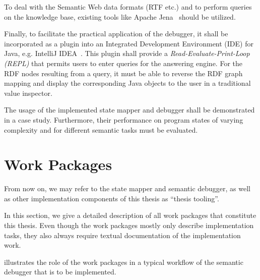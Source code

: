 \documentclass[
	english,
	accentcolor=9c,%
  marginpar=0cm %
	]{tudapub}
\begin{document}
To deal with the Semantic Web data formats (RTF etc.) and to perform queries on
the knowledge base, existing tools like Apache Jena~\cite{jena} should be utilized.

Finally, to facilitate the practical application of the debugger, it shall be
incorporated as a plugin into an Integrated Development Environment (IDE) for
Java, e.g. IntelliJ IDEA~\cite{idea}.
This plugin shall provide a \emph{Read-Evaluate-Print-Loop (REPL)} that permits
users to enter queries for the answering engine.
For the RDF nodes resulting from a query, it must be able to reverse the RDF
graph mapping and display the corresponding Java objects to the user in a
traditional value inspector.

The usage of the implemented state mapper and debugger shall be demonstrated in
a case study. Furthermore, their performance on program states of varying
complexity and for different semantic tasks must be evaluated.

%
%
%
%

\section{Work Packages}%
\label{sec:work_packages}

From now on, we may refer to the state mapper and semantic debugger, as well as
other implementation components of this thesis as \enquote{thesis tooling}.

In this section, we give a detailed description of all work packages that
constitute this thesis. Even though the work packages mostly only describe
implementation tasks, they also always require textual documentation of the
implementation work.

 illustrates the role of the work packages in a typical
workflow of the semantic debugger that is to be implemented.
\end{document}
